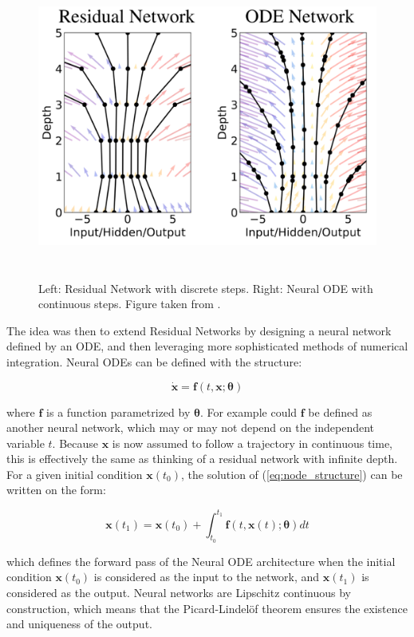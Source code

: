 \documentclass[12pt,a4paper]{book}
\begin{document}
\begin{figure}[H]
    \centering
    \includegraphics[height=10cm]{figs/resnetlimit.png}
    \caption{Left: Residual Network with discrete steps. Right: Neural ODE with continuous steps. Figure taken from \cite{node}.}
    \label{fig:resnetlimit}
\end{figure}

The idea was then to extend Residual Networks by designing a neural network defined by an ODE, and then leveraging more sophisticated methods of numerical integration. Neural ODEs can be defined with the structure:

\begin{equation}
    \dot{\bm{x}} = \bm{f}(t, \bm{x}; \bm{\theta})
    \label{eq:node_structure}
\end{equation}

\noindent where $\bm{f}$ is a function parametrized by $\bm{\theta}$. For example could $\bm{f}$ be defined as another neural network, which may or may not depend on the independent variable $t$. Because $\bm{x}$ is now assumed to follow a trajectory in continuous time, this is effectively the same as thinking of a residual network with infinite depth. For a given initial condition $\bm{x}(t_0)$, the solution of (\ref{eq:node_structure}) can be written on the form:

\begin{equation}
    \bm{x}(t_1) = \bm{x}(t_0) + \int_{t_0}^{t_1} \bm{f}(t, \bm{x}(t) ; \bm{\theta}) dt
    \label{eq:node_forward}
\end{equation}

\noindent which defines the forward pass of the Neural ODE architecture when the initial condition $\bm{x}(t_0)$ is considered as the input to the network, and $\bm{x}(t_1)$ is considered as the output. Neural networks are Lipschitz continuous by construction, which means that the Picard-Lindelöf theorem ensures the existence and uniqueness of the output.
\end{document}
